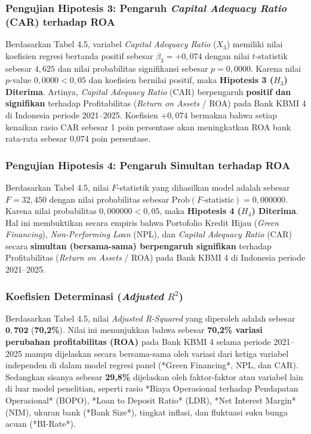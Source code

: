 \documentclass[12pt,a4paper]{article}
\numberwithin{equation}{section}
\begin{document}
\subsubsection{Pengujian Hipotesis 3: Pengaruh \emph{Capital Adequacy Ratio} (CAR) terhadap ROA}
\noindent
Berdasarkan Tabel 4.5, variabel \emph{Capital Adequacy Ratio} ($X_3$) memiliki nilai koefisien regresi bertanda positif sebesar $\beta_3 = +0{,}074$ dengan nilai $t$-statistik sebesar $4{,}625$ dan nilai probabilitas signifikansi sebesar $p = 0{,}0000$. Karena nilai $p$-value $0{,}0000 < 0{,}05$ dan koefisien bernilai positif, maka \textbf{Hipotesis 3 ($H_3$) Diterima}. Artinya, \emph{Capital Adequacy Ratio} (CAR) berpengaruh \textbf{positif dan signifikan} terhadap Profitabilitas (\emph{Return on Assets} / ROA) pada Bank KBMI 4 di Indonesia periode 2021--2025. Koefisien $+0{,}074$ bermakna bahwa setiap kenaikan rasio CAR sebesar 1 poin persentase akan meningkatkan ROA bank rata-rata sebesar 0,074 poin persentase.

\subsubsection{Pengujian Hipotesis 4: Pengaruh Simultan terhadap ROA}
\noindent
Berdasarkan Tabel 4.5, nilai $F$-statistik yang dihasilkan model adalah sebesar $F = 32{,}450$ dengan nilai probabilitas sebesar $\text{Prob}(F\text{-statistic}) = 0{,}000000$. Karena nilai probabilitas $0{,}000000 < 0{,}05$, maka \textbf{Hipotesis 4 ($H_4$) Diterima}. Hal ini membuktikan secara empiris bahwa Portofolio Kredit Hijau (\emph{Green Financing}), \emph{Non-Performing Loan} (NPL), dan \emph{Capital Adequacy Ratio} (CAR) secara \textbf{simultan (bersama-sama) berpengaruh signifikan} terhadap Profitabilitas (\emph{Return on Assets} / ROA) pada Bank KBMI 4 di Indonesia periode 2021--2025.

\subsubsection{Koefisien Determinasi (\texorpdfstring{\emph{Adjusted} $R^2$}{Adjusted R-Squared})}
\noindent
Berdasarkan Tabel 4.5, nilai \emph{Adjusted R-Squared} yang diperoleh adalah sebesar $\mathbf{0{,}702}$ (\textbf{70,2\%}). Nilai ini menunjukkan bahwa sebesar \textbf{70,2\% variasi perubahan profitabilitas (ROA)} pada Bank KBMI 4 selama periode 2021--2025 mampu dijelaskan secara bersama-sama oleh variasi dari ketiga variabel independen di dalam model regresi panel (*Green Financing*, NPL, dan CAR). Sedangkan sisanya sebesar \textbf{29,8\%} dijelaskan oleh faktor-faktor atau variabel lain di luar model penelitian, seperti rasio *Biaya Operasional terhadap Pendapatan Operasional* (BOPO), *Loan to Deposit Ratio* (LDR), *Net Interest Margin* (NIM), ukuran bank (*Bank Size*), tingkat inflasi, dan fluktuasi suku bunga acuan (*BI-Rate*).
\end{document}
